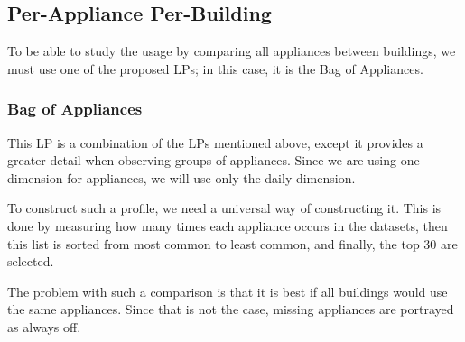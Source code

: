 


\subsection{Per-Appliance Per-Building}

To be able to study the usage by comparing all appliances between buildings,
we must use one of the proposed LPs; in this case, it is the Bag of Appliances.

\subsubsection{Bag of Appliances}

This LP is a combination of the LPs mentioned above,
except it provides a greater detail when observing groups of appliances.
Since we are using one dimension for appliances, we will use only the daily dimension.

To construct such a profile, we need a universal way of constructing it.
This is done by measuring how many times each appliance occurs in the datasets,
then this list is sorted from most common to least common, and finally, the top 30 are selected.

The problem with such a comparison is that it is best
if all buildings would use the same appliances.
Since that is not the case, missing appliances are portrayed as always off.


